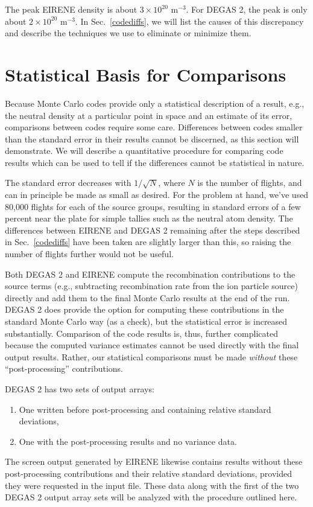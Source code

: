 \documentclass[12pt]{report}
\begin{document}
The peak EIRENE density is about $3 \times 10^{20}$ m$^{-3}$. For DEGAS 2,
the peak is only about $2 \times 10^{20}$ m$^{-3}$. In Sec.~\ref{codediffs},
we will list the causes of this discrepancy and describe the techniques
we use to eliminate or minimize them.

\section{Statistical Basis for Comparisons}
\label{statcompare}

Because Monte Carlo codes provide only a statistical description of
a result, e.g., the neutral density at a particular point in space 
and an estimate of its error, comparisons between codes require some
care. Differences between codes smaller than the standard error in their
results cannot be discerned, as this section will demonstrate. 
We will describe a quantitative procedure for comparing code results
which can be used to tell if the differences cannot be statistical
in nature.

The
standard error decreases with $1/\sqrt{N}$, where $N$ is the number
of flights, and can in principle be made as small as desired. For the
problem at hand, we've used 80,000 flights for each of the source
groups, resulting in standard errors of a few percent near the plate
for simple tallies such as the neutral atom density. The differences
between EIRENE and DEGAS 2 remaining after the steps described in 
Sec.~\ref{codediffs} have been taken are slightly larger than this, so
raising the number of flights further would not be useful.

Both DEGAS 2 and EIRENE compute the recombination  contributions to
the source terms (e.g., subtracting recombination rate from the ion
particle source) directly and add them to the final Monte Carlo results
at the end of the run. DEGAS 2 does provide the option for computing
these contributions in the standard Monte Carlo way (as a check), but
the statistical error is increased substantially.
Comparison of the code results is, thus, further complicated because the
computed variance estimates cannot be used directly with the final output
results.
Rather, our statistical comparisons must be made {\em without} these
``post-processing'' contributions.

DEGAS 2 has two sets of output arrays:
\begin{enumerate}
   \item One written before post-processing and containing relative
standard deviations,
   \item One with the post-processing results and no variance data.
\end{enumerate}
The screen output generated by EIRENE likewise contains 
results without these post-processing
contributions and their relative standard deviations, provided
they were requested in the input file. These data along with the
first of the two DEGAS 2 output array sets will be analyzed with
the procedure outlined here.  
\end{document}
